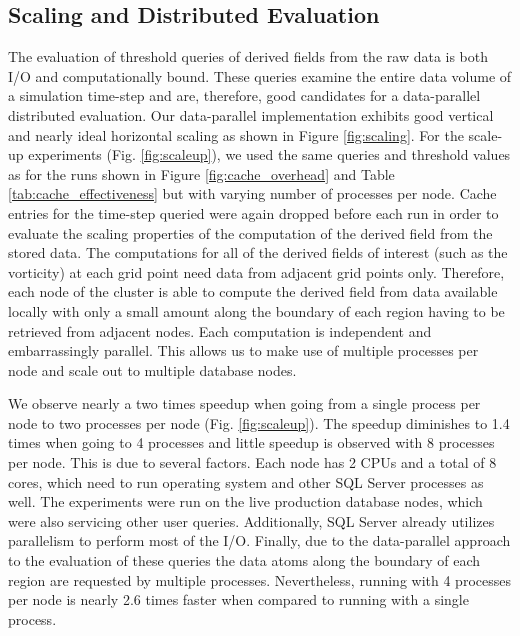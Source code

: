 \documentclass{sig-alternate}
\begin{document}
\subsection{Scaling and Distributed Evaluation}
The evaluation of threshold queries of derived fields from the raw data is both I/O and computationally bound. These queries examine the entire data
volume of a simulation time-step and are, therefore, good candidates for a data-parallel distributed evaluation. 
Our data-parallel implementation exhibits good vertical and nearly ideal horizontal scaling as shown in Figure \ref{fig:scaling}. 
For the scale-up experiments (Fig. \ref{fig:scaleup}), we used the same
queries and threshold values as for the runs shown in Figure \ref{fig:cache_overhead} and Table \ref{tab:cache_effectiveness} 
but with varying number of processes per node. Cache entries for the
time-step queried were again dropped before each run in order to evaluate the scaling properties of the computation of the derived field from the stored data.
The computations for all of 
the derived fields of interest (such as the vorticity) at each grid point need data from adjacent grid points only. Therefore, each node of the cluster is able to
compute the derived field from data available locally with only a small amount along the boundary of each region having to be retrieved from adjacent nodes.
Each computation is independent and embarrassingly parallel. This allows us to make use of multiple processes per node and scale out to
multiple database nodes.

We observe nearly a two times speedup when going from a single process per node to two processes per node (Fig. \ref{fig:scaleup}). 
The speedup diminishes to 1.4 times when going to 4 processes and little speedup is 
observed with 8 processes per node. This is due to several factors. Each node has 2 CPUs and a total of 8 cores, which need to run operating system and other SQL Server
processes as well. The experiments were run on the live production database nodes, which were also servicing other user queries. Additionally, SQL
Server already utilizes parallelism to perform most of the I/O. Finally, due to the data-parallel approach to the evaluation of these queries the data atoms along
the boundary of each region are requested by multiple processes. Nevertheless, running with 4 processes per node is nearly 2.6 times faster when
compared to running with a single process.
\end{document}
